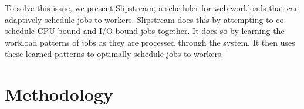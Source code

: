 \documentclass{proc}
\begin{document}
To solve this issue, we present Slipstream, a scheduler for web workloads that
can adaptively schedule jobs to workers. Slipstream does this by attempting to
co-schedule CPU-bound and I/O-bound jobs together. It does so by learning the
workload patterns of jobs as they are processed through the system. It then uses
these learned patterns to optimally schedule jobs to workers.

\section{Methodology}
\end{document}
